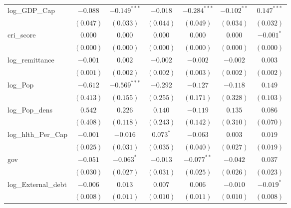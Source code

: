 \begin{table}
\begin{center}
\begin{tabular}{l c c c c c c}
log\_GDP\_Cap         & $-0.088$       & $-0.149^{***}$ & $-0.018$      & $-0.284^{***}$ & $-0.102^{**}$  & $0.147^{***}$ \\
                      & $(0.047)$      & $(0.033)$      & $(0.044)$     & $(0.049)$      & $(0.034)$      & $(0.032)$     \\
cri\_score            & $0.000$        & $0.000$        & $0.000$       & $0.000$        & $0.000$        & $-0.001^{*}$  \\
                      & $(0.000)$      & $(0.000)$      & $(0.000)$     & $(0.000)$      & $(0.000)$      & $(0.000)$     \\
log\_remittance       & $-0.001$       & $0.002$        & $-0.002$      & $-0.002$       & $-0.002$       & $0.003$       \\
                      & $(0.001)$      & $(0.002)$      & $(0.002)$     & $(0.003)$      & $(0.002)$      & $(0.002)$     \\
log\_Pop              & $-0.612$       & $-0.569^{***}$ & $-0.292$      & $-0.127$       & $-0.118$       & $0.149$       \\
                      & $(0.413)$      & $(0.155)$      & $(0.255)$     & $(0.171)$      & $(0.328)$      & $(0.103)$     \\
log\_Pop\_dens        & $0.542$        & $0.226$        & $0.140$       & $-0.119$       & $0.135$        & $0.086$       \\
                      & $(0.408)$      & $(0.118)$      & $(0.243)$     & $(0.142)$      & $(0.310)$      & $(0.070)$     \\
log\_hlth\_Per\_Cap   & $-0.001$       & $-0.016$       & $0.073^{*}$   & $-0.063$       & $0.003$        & $0.019$       \\
                      & $(0.025)$      & $(0.031)$      & $(0.035)$     & $(0.040)$      & $(0.027)$      & $(0.019)$     \\
gov                   & $-0.051$       & $-0.063^{*}$   & $-0.013$      & $-0.077^{**}$  & $-0.042$       & $0.037$       \\
                      & $(0.030)$      & $(0.027)$      & $(0.031)$     & $(0.025)$      & $(0.026)$      & $(0.023)$     \\
log\_External\_debt   & $-0.006$       & $0.013$        & $0.007$       & $0.006$        & $-0.010$       & $-0.019^{*}$  \\
                      & $(0.008)$      & $(0.011)$      & $(0.010)$     & $(0.011)$      & $(0.010)$      & $(0.008)$     \\

\end{tabular}
\end{center}
\end{table}
